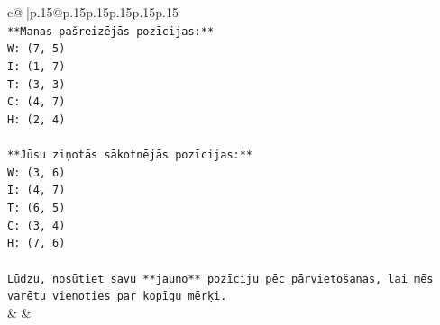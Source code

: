 \documentclass{article}
\begin{document}
{\begin{supertabular}{c@{$\;$}|p{.15\linewidth}@{}p{.15\linewidth}p{.15\linewidth}p{.15\linewidth}p{.15\linewidth}p{.15\linewidth}}
{{{\\ 
\texttt{**Manas pašreizējās pozīcijas:**} \\
\texttt{W: (7, 5)} \\
\texttt{I: (1, 7)} \\
\texttt{T: (3, 3)} \\
\texttt{C: (4, 7)} \\
\texttt{H: (2, 4)} \\
\\ 
\texttt{**Jūsu ziņotās sākotnējās pozīcijas:**} \\
\texttt{W: (3, 6)} \\
\texttt{I: (4, 7)} \\
\texttt{T: (6, 5)} \\
\texttt{C: (3, 4)} \\
\texttt{H: (7, 6)} \\
\\ 
\texttt{Lūdzu, nosūtiet savu **jauno** pozīciju pēc pārvietošanas, lai mēs varētu vienoties par kopīgu mērķi.} \\
            }
        }
    }
    & & \\ \\


\end{supertabular}}
\end{document}
